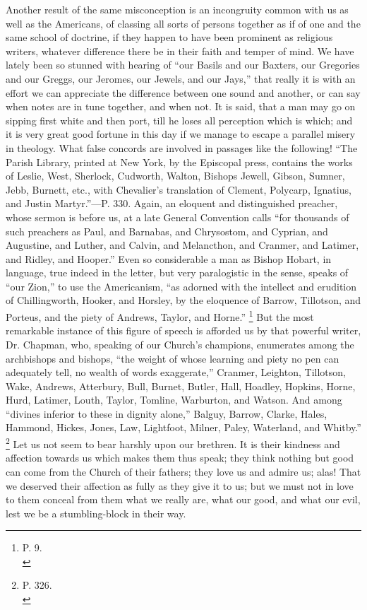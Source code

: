 Another result of the same misconception is an
incongruity common with us as well as the Americans, of classing all
sorts of persons together as if of one and the same school of
doctrine, if they happen to have been prominent as religious writers,
whatever difference there be in their faith and temper of mind. We
have lately been so stunned with hearing of ``our Basils and our
Baxters, our Gregories and our Greggs, our Jeromes, our Jewels, and
our Jays,'' that really it is with an effort we can appreciate the
difference between one sound and another, or can say when notes are in
tune together, and when not. It is said, that a man may go on sipping
first white and then port, till he loses all perception which is
which; and it is very great good fortune in this day if we manage to
escape a parallel misery in theology. What false concords are involved
in passages like the following! ``The Parish Library, printed at New
York, by the Episcopal press, contains the works of Leslie,
West, Sherlock, Cudworth, Walton, Bishops Jewell, Gibson, Sumner, Jebb,
Burnett, etc., with Chevalier's translation of Clement, Polycarp,
Ignatius, and Justin Martyr.''—P. 330. Again, an eloquent and
distinguished preacher, whose sermon is before us, at a late General
Convention calls ``for thousands of such preachers as Paul, and
Barnabas, and Chrysostom, and Cyprian, and Augustine, and Luther, and
Calvin, and Melancthon, and Cranmer, and Latimer, and Ridley, and
Hooper.'' Even so considerable a man as Bishop Hobart, in language,
true indeed in the letter, but very paralogistic in the sense, speaks
of ``our Zion,'' to use the Americanism, ``as adorned with the intellect
and erudition of Chillingworth, Hooker, and Horsley, by the eloquence
of Barrow, Tillotson, and Porteus, and the piety of Andrews, Taylor,
and Horne.'' \footnote{P. 9.\textbf{}\\} But the most
remarkable instance of this figure of speech is afforded us by that
powerful writer, Dr. Chapman, who, speaking of our Church's champions,
enumerates among the archbishops and bishops, ``the weight of whose
learning and piety no pen can adequately tell, no wealth of words
exaggerate,'' Cranmer, Leighton, Tillotson, Wake, Andrews, Atterbury,
Bull, Burnet, Butler, Hall, Hoadley, Hopkins, Horne, Hurd, Latimer,
Louth, Taylor, Tomline, Warburton, and Watson. And among ``divines
inferior to these in dignity alone,'' Balguy, Barrow, Clarke, Hales,
Hammond, Hickes, Jones, Law, Lightfoot, Milner, Paley, Waterland, and
Whitby.'' \footnote{P. 326.\textbf{}\\} Let us not seem
to bear harshly upon our brethren. It is their kindness and affection
towards us which makes them thus speak; they think nothing but good
can come from the Church of their fathers; they love us and admire us;
alas! That we deserved their affection as fully as they give it
to us; but we must not in love to them conceal from them what we
really are, what our good, and what our evil, lest we be a
stumbling-block in their way.

